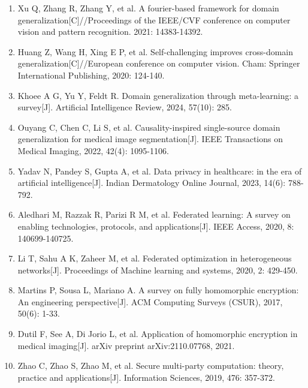 \begin{enumerate}
  \protect{}\label{_Ref213949607}{}Gulrajani I, Lopez-Paz D. In search of lost domain generalization{[}J{]}. arXiv preprint arXiv:2007.01434, 2020.
\item
  \protect{}\label{_Ref213949788}{}Xu Q, Zhang R, Zhang Y, et al. A fourier-based framework for domain generalization{[}C{]}//Proceedings of the IEEE/CVF conference on computer vision and pattern recognition. 2021: 14383-14392.
\item
  \protect{}\label{_Ref213949796}{}Huang Z, Wang H, Xing E P, et al. Self-challenging improves cross-domain generalization{[}C{]}//European conference on computer vision. Cham: Springer International Publishing, 2020: 124-140.
\item
  \protect{}\label{_Ref213949803}{}Khoee A G, Yu Y, Feldt R. Domain generalization through meta-learning: a survey{[}J{]}. Artificial Intelligence Review, 2024, 57(10): 285.
\item
  \protect{}\label{_Ref213949863}{}Ouyang C, Chen C, Li S, et al. Causality-inspired single-source domain generalization for medical image segmentation{[}J{]}. IEEE Transactions on Medical Imaging, 2022, 42(4): 1095-1106.
\item
  \protect{}\label{_Ref213950358}{}Yadav N, Pandey S, Gupta A, et al. Data privacy in healthcare: in the era of artificial intelligence{[}J{]}. Indian Dermatology Online Journal, 2023, 14(6): 788-792.
\item
  \protect{}\label{_Ref213950376}{}Aledhari M, Razzak R, Parizi R M, et al. Federated learning: A survey on enabling technologies, protocols, and applications{[}J{]}. IEEE Access, 2020, 8: 140699-140725.
\item
  \protect{}\label{_Ref213950391}{}Li T, Sahu A K, Zaheer M, et al. Federated optimization in heterogeneous networks{[}J{]}. Proceedings of Machine learning and systems, 2020, 2: 429-450.
\item
  \protect{}\label{_Ref213950427}{}Martins P, Sousa L, Mariano A. A survey on fully homomorphic encryption: An engineering perspective{[}J{]}. ACM Computing Surveys (CSUR), 2017, 50(6): 1-33.
\item
  \protect{}\label{_Ref213950433}{}Dutil F, See A, Di Jorio L, et al. Application of homomorphic encryption in medical imaging{[}J{]}. arXiv preprint arXiv:2110.07768, 2021.
\item
  \protect{}\label{_Ref213950438}{}Zhao C, Zhao S, Zhao M, et al. Secure multi-party computation: theory, practice and applications{[}J{]}. Information Sciences, 2019, 476: 357-372.

\end{enumerate}
